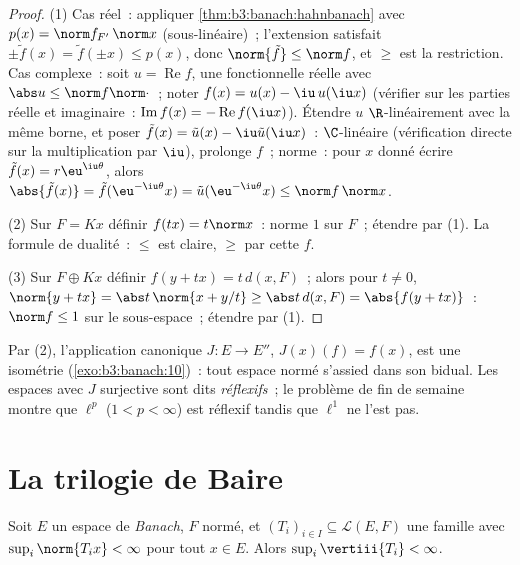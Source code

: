 \begin{proof}
(1) Cas réel~: appliquer \cref{thm:b3:banach:hahnbanach} avec
$p(x) = \norm f_{F'}\,\norm x$ (sous-linéaire)~; l'extension
satisfait $\pm\tilde f(x) = \tilde f(\pm x) \leq p(x)$, donc
$\norm{\tilde f} \leq \norm f$, et $\geq$ est la restriction.
Cas complexe~: soit $u = \operatorname{Re}f$, une fonctionnelle
réelle avec $\abs u \leq \norm f\norm\cdot$~; noter $f(x) =
u(x) - \iu\,u(\iu x)$ (vérifier sur les parties réelle et
imaginaire~: $\operatorname{Im}f(x) =
-\operatorname{Re}f(\iu x)$). Étendre $u$ $\R$-linéairement
avec la même borne, et poser $\tilde f(x) = \tilde u(x) -
\iu\tilde u(\iu x)$~: $\C$-linéaire (vérification directe sur
la multiplication par $\iu$), prolonge $f$~; norme~: pour $x$
donné écrire $\tilde f(x) = r\eu^{\iu\theta}$, alors
$\abs{\tilde f(x)} = \tilde f(\eu^{-\iu\theta}x) = \tilde
u(\eu^{-\iu\theta}x) \leq \norm f\,\norm x$.

(2) Sur $F = Kx$ définir $f(tx) = t\norm x$~: norme $1$ sur
$F$~; étendre par (1). La formule de dualité~: $\leq$ est
claire, $\geq$ par cette $f$.

(3) Sur $F \oplus Kx$ définir $f(y + tx) = t\,d(x, F)$~; alors
pour $t \neq 0$, $\norm{y + tx} = \abs t\,\norm{x + y/t} \geq
\abs t\,d(x, F) = \abs{f(y + tx)}$~: $\norm f \leq 1$ sur le
sous-espace~; étendre par (1).
\end{proof}

\begin{remark}\label{rem:b3:banach:bidual}
Par (2), l'application canonique $J \colon E \to E''$,
$J(x)(f) = f(x)$, est une isométrie
(\cref{exo:b3:banach:10})~: tout espace normé s'assied dans son
bidual. Les espaces avec $J$ surjective sont dits
\emph{réflexifs}~; le problème de fin de
semaine montre que $\ell^p$ ($1 < p < \infty$) est réflexif
tandis que $\ell^1$ ne l'est pas.
\end{remark}

\section{La trilogie de Baire}

\begin{theorem}
\label{thm:b3:banach:banachsteinhaus}
Soit $E$ un espace de \emph{Banach}, $F$ normé, et
$(T_i)_{i\in I} \subseteq \mathcal L(E, F)$ une famille avec
$\sup_i \norm{T_ix} < \infty$ pour tout $x \in E$. Alors
$\sup_i \vertiii{T_i} < \infty$.
\end{theorem}

